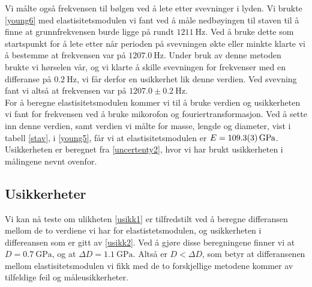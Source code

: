 \documentclass[%
 reprint,
 amsmath,amssymb,
 aps,
 norsk,
 booktabs
]{revtex4-1}
\begin{document}
Vi målte også frekvensen til bølgen ved å lete etter svevninger i lyden. Vi brukte \eqref{young6} med elastisitetsmodulen vi fant ved å måle nedbøyingen til staven til å finne at grunnfrekvensen burde ligge på rundt $\SI{1211}{\hertz}$. Ved å bruke dette som startspunkt for å lete etter når perioden på svevningen økte eller minkte klarte vi å bestemme at frekvensen var på $\SI{1207.0}{\hertz}$. Under bruk av denne metoden brukte vi hørselen vår, og vi klarte å skille svevningen for frekvenser med en differanse på $\SI{0.2}{\hertz}$, vi får derfor en usikkerhet lik denne verdien. Ved svevning fant vi altså at frekvensen var på $1207.0\pm\SI{0.2}{\hertz}$.\\
For å beregne elastisitetsmodulen kommer vi til å bruke verdien og usikkerheten vi fant for frekvensen ved å bruke mikorofon og fouriertransformasjon. Ved å sette inn denne verdien, samt verdien vi målte for masse, lengde og diameter, vist i tabell \vref{stav}, i \eqref{young5}, får vi at elastisitetsmodulen er $E = \SI{109.3\pm0.3}{\giga\pascal}$. Usikkerheten er beregnet fra \eqref{uncertenty2}, hvor vi har brukt usikkerheten i målingene nevnt ovenfor.
\subsection{Usikkerheter}
Vi kan nå teste om ulikheten \eqref{usikk1} er tilfredstilt ved å beregne differansen mellom de to verdiene vi har for elastistetsmodulen, og usikkerheten i differeansen som er gitt av \eqref{usikk2}. Ved å gjøre disse beregningene finner vi at $D = \SI{0.7}{\giga\pascal}$, og at $\Delta D = \SI{1.1}{\giga\pascal}$. Altså er $D<\Delta D$, som betyr at differansenen mellom elastisitetsmodulen vi fikk med de to forskjellige metodene kommer av tilfeldige feil og måleusikkerheter.
\end{document}
